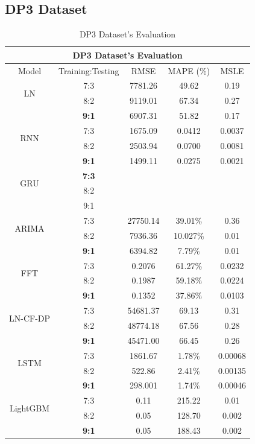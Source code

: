 \documentclass{ieeeojies}
\begin{document}
\vspace{-1em}

\subsection{DP3 Dataset}
\begin{table}[H]
    \centering
    \begin{tabular}{|c|c|c|c|c|}
         \hline
         \multicolumn{5}{|c|}{\textbf{DP3 Dataset's Evaluation}}\\
         \hline
         \centering Model & Training:Testing & RMSE & MAPE (\%) & MSLE\\
         \hline
         \multirow{2}{*}{LN}& 7:3 & 7781.26 & 49.62 & 0.19\\ & 8:2 & 9119.01 & 67.34 & 0.27\\ & \textbf{9:1}& 6907.31& 51.82 & 0.17\\
         \hline
         \multirow{2}{*}{RNN} & 7:3&1675.09&0.0412&0.0037\\ & 8:2&2503.94&0.0700&0.0081\\ & \textbf{9:1} & 1499.11&0.0275 &0.0021 \\
         \hline
         \multirow{2}{*}{GRU} & \textbf{7:3}	& & & \\ & 8:2 & & & \\ & 9:1 & & & \\
         \hline
         \multirow{2}{*}{ARIMA} & 7:3 & 27750.14  & 39.01\%  &  0.36 \\ & 8:2 & 7936.36  & 10.027\% & 0.01 \\ & \textbf{9:1} & 6394.82 & 7.79\% & 0.01 \\
         \hline
         \multirow{2}{*}{FFT}& 7:3& 0.2076& 61.27\%&0.0232 \\ & 8:2 & 0.1987& 59.18\%& 0.0224\\ & \textbf{9:1}& 0.1352& 37.86\%& 0.0103\\
         \hline
         \multirow{2}{*}{LN-CF-DP} & 7:3 & 54681.37 & 69.13 & 0.31 \\ & {8:2} & 48774.18 & 67.56 & 0.28 \\ & \textbf{9:1} & 45471.00 &66.45&0.26\\
         \hline
         \multirow{2}{*}{LSTM}& 7:3& 1861.67& 1.78\%& 0.00068\\ & 8:2 & 522.86& 2.41\%& 0.00135\\ & \textbf{9:1}& 298.001& 1.74\%& 0.00046\\
         \hline
         \multirow{2}{*}{LightGBM}& 7:3& 0.11& 215.22 & 0.01\\ & 8:2 & 0.05& 128.70 & 0.002\\ & \textbf{9:1}& 0.05& 188.43 & 0.002\\
         \hline
    \end{tabular}
    \caption{DP3 Dataset's Evaluation}
    \label{dp3result}
\end{table}
\end{document}
